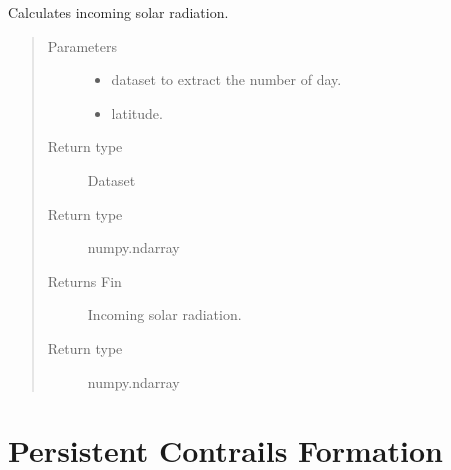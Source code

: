 \documentclass[a4paper,11pt,english]{sphinxmanual}
\begin{document}

\begin{fulllineitems}
\label{\detokenize{modules:envlib.accf.get_Fin}}
Calculates incoming solar radiation.
\begin{quote}\begin{description}
\item[{Parameters}] \leavevmode\begin{itemize}
\item {} 
 \textendash{} dataset to extract the number of day.

\item {} 
 \textendash{} latitude.

\end{itemize}

\item[{Return type}] \leavevmode
Dataset

\item[{Return type}] \leavevmode
numpy.ndarray

\item[{Returns Fin}] \leavevmode
Incoming solar radiation.

\item[{Return type}] \leavevmode
numpy.ndarray

\end{description}\end{quote}

\end{fulllineitems}



\section{Persistent Contrails Formation}
\label{\detokenize{modules:module-envlib.contrail}}\label{\detokenize{modules:persistent-contrails-formation}}
\end{document}
